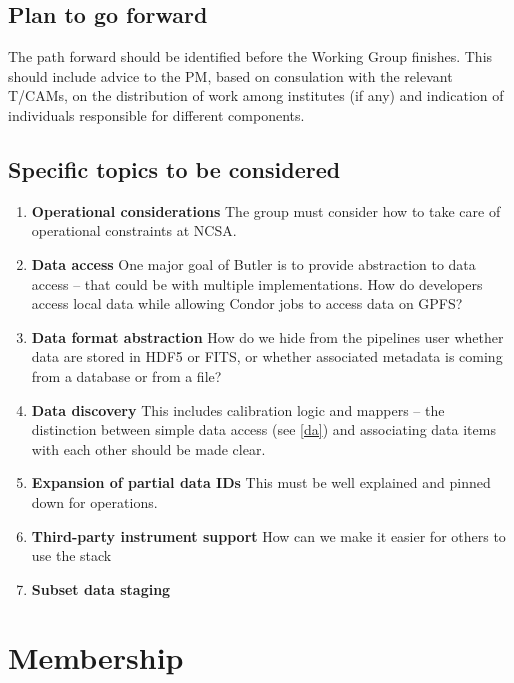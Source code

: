 \subsection{Plan to go forward}

The path forward should be identified before the Working Group finishes.
This should include advice to the PM, based on consulation with the relevant T/CAMs, on the distribution of work among institutes (if any) and indication of individuals responsible for different components.

\subsection{Specific topics to be considered}

\begin{enumerate}
\item \textbf{Operational considerations}
The group must consider how to take care of operational constraints at NCSA.

\item \textbf{Data access}\label{da}
One major goal of Butler is to provide abstraction to data access -- that could be with multiple implementations.
How do developers access local data while allowing Condor jobs to access data on GPFS?

\item \textbf{Data format abstraction}
How do we hide from the pipelines user whether data are stored in HDF5 or FITS, or whether associated metadata is coming from a database or from a file?

\item \textbf{Data discovery}
This includes  calibration logic and mappers -- the distinction between simple data access (see \ref{da}) and associating data items with each other should be made clear.

\item \textbf{Expansion of partial data IDs} This must be well explained and pinned down for operations.

\item \textbf{Third-party instrument support}  How can we make it easier for others to use the stack
\item \textbf{Subset data staging}
\end{enumerate}

\section{Membership}

